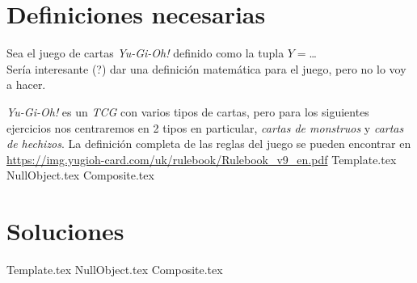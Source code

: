 \section{Definiciones necesarias}
  Sea el juego de cartas \textit{Yu-Gi-Oh!} definido como la tupla 
  $Y = $\dots\\
  Sería interesante (?) dar una definición matemática para el juego, pero no lo voy a 
  hacer.

  \textit{Yu-Gi-Oh!} es un \textit{TCG} con varios tipos de cartas, pero para los 
  siguientes ejercicios nos centraremos en 2 tipos en particular, \textit{cartas de 
  monstruos} y \textit{cartas de hechizos}.
  La definición completa de las reglas del juego se pueden encontrar en 
  \url{https://img.yugioh-card.com/uk/rulebook/Rulebook_v9_en.pdf}
%
{Template.tex} 
{NullObject.tex}
{Composite.tex}

\pagebreak
\section{Soluciones}
  {Template.tex}
  {NullObject.tex}
  {Composite.tex}
%